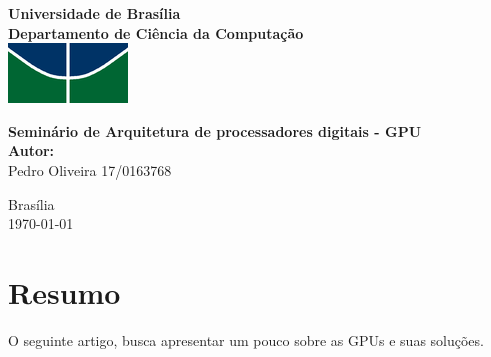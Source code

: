 \documentclass[a4paper, 12pt]{article}
\begin{document}
\begin{titlepage}
\begin{center}
\textbf{\LARGE Universidade de Brasília}\\[0.5cm] 
\textbf{\large Departamento de Ciência da Computação}\\[0.2cm]
\vspace{20pt}
\includegraphics{Logo_UnB.png}\\[1cm]

\par
\vspace{32pt}
\textbf{\LARGE Seminário de Arquitetura de processadores digitais - GPU }\\
\vspace{30pt}
\textbf {\Large Autor:}\\[0.2cm]
\Large {Pedro Oliveira		17/0163768}\\[0.1cm]

\end{center}

\par
\vfill
\begin{center}
{{\normalsize Brasília}\\
{\normalsize \today}}
\end{center}
\end{titlepage}

\newpage
\tableofcontents
\thispagestyle{empty}

\newpage



\section{Resumo}
O seguinte artigo, busca apresentar um pouco sobre as GPUs e suas soluções.
\end{document}
